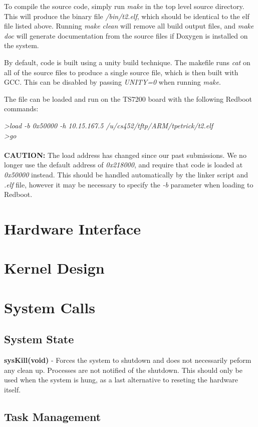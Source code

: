 \documentclass[twoside,a4paper]{refart}
\begin{document}
To compile the source code, simply run \textit{make} in the top level source directory. This will produce the binary file \textit{/bin/t2.elf}, which should be identical to the elf file listed above. Running \textit{make clean} will remove all build output files, and \textit{make doc} will generate documentation from the source files if Doxygen is installed on the system.

By default, code is built using a unity build technique. The makefile runs \textit{cat} on all of the source files to produce a single source file, which is then built with GCC. This can be disabled by passing \textit{UNITY=0} when running \textit{make}.

The file can be loaded and run on the TS7200 board with the following Redboot commands:

\textit{\textgreater load -b 0x50000 -h 10.15.167.5 /u/cs452/tftp/ARM/tpetrick/t2.elf}\\
\textit{\textgreater go}\\\\

\textbf{CAUTION:}  The load address has changed since our past submissions. We no longer use the default address of \textit{0x218000}, and require that code is loaded at \textit{0x50000} instead. This should be handled automatically by the linker script and \textit{.elf} file, however it may be necessary to specify the \textit{-b} parameter when loading to Redboot.

\section{Hardware Interface}
\section{Kernel Design}

\section{System Calls}
\subsection{System State}
\textbf{sysKill(void)} - Forces the system to shutdown and does not necessarily peform any clean up. Processes are not notified of the shutdown. This should only be used when the system is hung, as a last alternative to reseting the hardware itself.
\subsection{Task Management}
\end{document}
